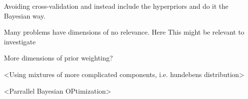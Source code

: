 Avoiding cross-validation and instead include the hyperpriors and do it the Bayesian way. 

Many problems have dimensions of no relevance. Here This might be relevant to investigate

More dimensions of prior weighting?

<Using mixtures of more complicated components, i.e. hundebens distribution>
 
<Parrallel Bayesian OPtimization>

